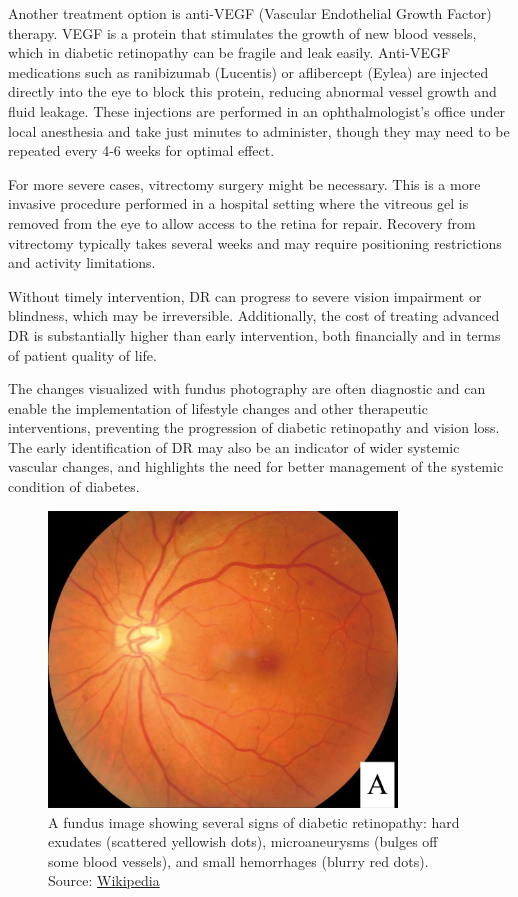 \documentclass[
  Letterpaper,
]{scrbook}
\begin{document}
Another treatment option is anti-VEGF (Vascular Endothelial Growth
Factor) therapy. VEGF is a protein that stimulates the growth of new
blood vessels, which in diabetic retinopathy can be fragile and leak
easily. Anti-VEGF medications such as ranibizumab (Lucentis) or
aflibercept (Eylea) are injected directly into the eye to block this
protein, reducing abnormal vessel growth and fluid leakage. These
injections are performed in an ophthalmologist's office under local
anesthesia and take just minutes to administer, though they may need to
be repeated every 4-6 weeks for optimal effect.

For more severe cases, vitrectomy surgery might be necessary. This is a
more invasive procedure performed in a hospital setting where the
vitreous gel is removed from the eye to allow access to the retina for
repair. Recovery from vitrectomy typically takes several weeks and may
require positioning restrictions and activity limitations.

Without timely intervention, DR can progress to severe vision impairment
or blindness, which may be irreversible. Additionally, the cost of
treating advanced DR is substantially higher than early intervention,
both financially and in terms of patient quality of life.

The changes visualized with fundus photography are often diagnostic and
can enable the implementation of lifestyle changes and other therapeutic
interventions, preventing the progression of diabetic retinopathy and
vision loss. The early identification of DR may also be an indicator of
wider systemic vascular changes, and highlights the need for better
management of the systemic condition of diabetes.

\begin{figure}[H]

{\centering \includegraphics[width=3.64583in,height=\textheight,keepaspectratio]{_resources/images/pathologies/Fundus_-_diabetic_retinopathy.png}

}

\caption{A fundus image showing several signs of diabetic retinopathy:
hard exudates (scattered yellowish dots), microaneurysms (bulges off
some blood vessels), and small hemorrhages (blurry red dots).\\
Source:
\href{https://en.wikipedia.org/wiki/Diabetic_retinopathy}{Wikipedia}}

\end{figure}%
\end{document}
